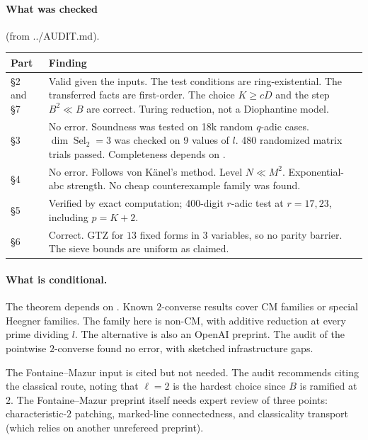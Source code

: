 \documentclass[11pt]{article}
\theoremstyle{definition}
\newcommand{\src}[1]{\textsf{#1}}
\DeclareMathOperator{\Sel}{Sel}
\begin{document}
\noindent\begin{minipage}{\textwidth}
\paragraph{What was checked} (from \src{../AUDIT.md}).
\begin{center}\small
\begin{tabular}{p{3.2cm}p{11.2cm}}
\toprule
Part & Finding\\
\midrule
\S2 and \S7 & Valid given the inputs.  The test conditions are ring-existential.  The transferred facts are first-order.  The choice $K\ge cD$ and the step $B^2\ll B$ are correct.  Turing reduction, not a Diophantine model.\\
\S3 & No error.  Soundness was tested on 18k random $q$-adic cases.  $\dim\Sel_2=3$ was checked on 9 values of $l$.  480 randomized matrix trials passed.  Completeness depends on \cite{PointwiseTwoConverse}.\\
\S4 & No error.  Follows von K\"anel's method.  Level $N\ll M^2$.  Exponential-abc strength.  No cheap counterexample family was found.\\
\S5 & Verified by exact computation; $400$-digit $r$-adic test at $r=17,23$, including $p=K+2$.\\
\S6 & Correct.  GTZ for $13$ fixed forms in $3$ variables, so no parity barrier.  The sieve bounds are uniform as claimed.\\
\bottomrule
\end{tabular}
\end{center}
\end{minipage}

\paragraph{What is conditional.}
The theorem depends on \cite[Thm.~1.1]{PointwiseTwoConverse}.  Known
$2$-converse results cover CM families or special Heegner families.  The
family here is non-CM, with additive reduction at every prime dividing
$l$.  The alternative \cite{UnrestrictedTwoConverse} is also an OpenAI
preprint.  The audit of the pointwise $2$-converse found no error, with
sketched infrastructure gaps.

The Fontaine--Mazur input \cite{OddRegularFontaineMazurAtTwo} is cited
but not needed.  The audit recommends citing the classical route, noting
that $\ell=2$ is the hardest choice since $B$ is ramified at $2$.  The
Fontaine--Mazur preprint itself needs expert review of three points:
characteristic-$2$ patching, marked-line connectedness, and classicality
transport (which relies on another unrefereed preprint).
\end{document}
